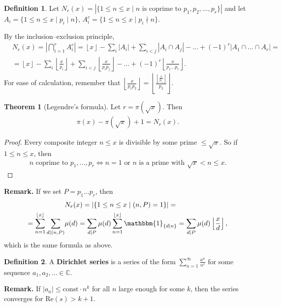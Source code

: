 \documentclass{article}
\theoremstyle{definition}
\newtheorem{theorem}{Theorem}[section]
\newtheorem{defn}{Definition}[section]
\begin{document}
\begin{defn}
   Let $N_r(x) = |\{1\le n\le x \mid n \text{ is coprime to }p_1,p_2,\ldots,p_r\}|$ and let $A_i = \{1\le n\le x \mid p_i \mid n\}$, $A_i^c = \{1\le n\le x \mid p_i \nmid n \}$.
\end{defn}
By the inclusion--exclusion principle,
\begin{align*}
    &N_r(x)=|\bigcap_{i=1}^r A_i^c| = \left\lfloor x \right\rfloor - \sum_{i}^{} |A_i| + \sum_{i<j}^{} |A_i \cap A_j| - \ldots +(-1)^r |A_1 \cap \ldots \cap A_r| = \\
    &=\left\lfloor x \right\rfloor - \sum_{i}^{} \left\lfloor \frac{x}{p_i} \right\rfloor + \sum_{i<j}^{} \left\lfloor \frac{x}{p_ip_j}  \right\rfloor-\ldots + (-1)^r \left\lfloor \frac{x}{p_1\ldots p_r} \right\rfloor.
\end{align*}
For ease of calculation, remember that $\left\lfloor \frac{x}{p_1p_2} \right\rfloor=\left\lfloor \frac{\left\lfloor \frac{x}{p_1} \right\rfloor}{p_2} \right\rfloor.$   

\begin{theorem}[Legendre's formula]
    Let $r=\pi(\sqrt{x})$. Then 
    \begin{align*}
        \pi(x) - \pi(\sqrt{x}) + 1 = N_r(x).
    \end{align*}
\end{theorem}
\begin{proof}
    Every composite integer $n\le x$ is divisible by some prime $\le \sqrt{x}$. So if $1\le n\le x$, then
    \begin{align*}
        n \text{ coprime to } p_1,\ldots,p_r \iff n=1 \text{ or }n \text{ is a prime with } \sqrt{x}<n\le x.
    \end{align*}
\end{proof}
\textbf{Remark.} If we set $P=p_1\ldots p_r$, then 
\begin{align*}
    &N_r(x) = |\{1\le n\le x \mid (n,P)=1\}| =\\
    =\sum_{n=1}^{\left\lfloor x \right\rfloor} \sum_{d \mid (n,P)}^{} &\mu(d) = \sum_{d \mid P}^{} \mu(d) \sum_{n=1}^{\left\lfloor x \right\rfloor} \mathbbm{1}_{\{d \mid n\}} = \sum_{d \mid P}^{} \mu(d) \left\lfloor \frac{x}{d} \right\rfloor, 
\end{align*}
which is the same formula as above.

\begin{defn}
    A \textbf{Dirichlet series} is a series of the form $\sum_{n=1}^{\infty} \frac{a^n}{n^s}$ for some sequence $a_1,a_2,\ldots \in \mathbb{C}$. 
\end{defn}
\textbf{Remark.} If $|a_n|\le \text{const}\cdot n^k$ for all $n$ large enough for some $k$, then the series converges for $\text{Re}(s)>k+1$.
\end{document}
